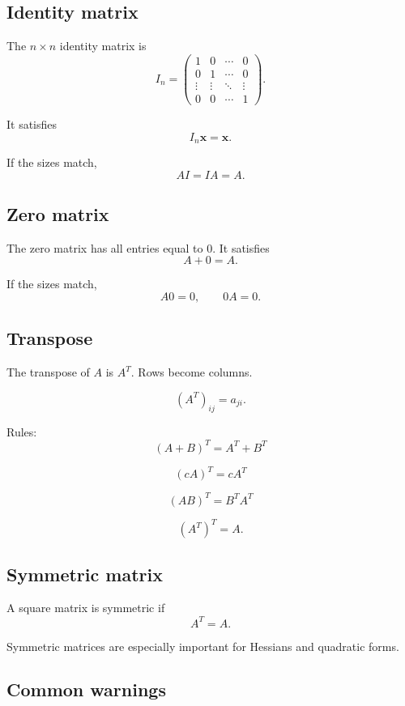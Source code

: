 \subsection*{Identity matrix}

The \(n\times n\) identity matrix is
\[
\boxed{
    I_n=
    \begin{pmatrix}
    1&0&\cdots&0\\
    0&1&\cdots&0\\
    \vdots&\vdots&\ddots&\vdots\\
    0&0&\cdots&1
    \end{pmatrix}.
}
\]

It satisfies
\[
\boxed{
    I_n\mathbf x=\mathbf x.
}
\]

If the sizes match,
\[
\boxed{
    AI=IA=A.
}
\]

\subsection*{Zero matrix}

The zero matrix has all entries equal to \(0\).  It satisfies
\[
\boxed{
    A+0=A.
}
\]

If the sizes match,
\[
\boxed{
    A0=0,
    \qquad
    0A=0.
}
\]

\subsection*{Transpose}

The transpose of \(A\) is \(A^T\).  Rows become columns.

\[
\boxed{
    (A^T)_{ij}=a_{ji}.
}
\]

Rules:
\[
\boxed{
    (A+B)^T=A^T+B^T
}
\]

\[
\boxed{
    (cA)^T=cA^T
}
\]

\[
\boxed{
    (AB)^T=B^T A^T
}
\]

\[
\boxed{
    (A^T)^T=A.
}
\]

\subsection*{Symmetric matrix}

A square matrix is symmetric if
\[
\boxed{
    A^T=A.
}
\]

Symmetric matrices are especially important for Hessians and quadratic forms.

\subsection*{Common warnings}

